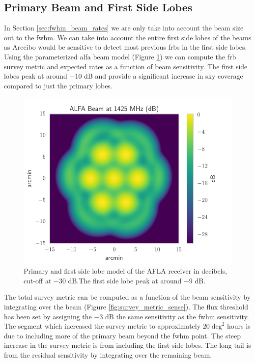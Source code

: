 \documentclass[a4paper,fleqn,usenatbib]{mnras}
\begin{document}
\subsection{Primary Beam and First Side Lobes}
\label{sec:full_beam_rates}

In Section \ref{sec:fwhm_beam_rates} we are only take into account the beam
size out to the \gls{fwhm}. We can take into account the entire first side lobes
of the beams as Arecibo would be sensitive to detect most previous
\glspl{frb} in the first side lobes. Using the parameterized \gls{alfa} beam
model (Figure \ref{fig:alfa_beam}) \citep{GALFAbeam} we can compute the
\gls{frb} survey metric and expected rates as a function of beam sensitivity.
The first side lobes peak at around $-10$ dB and provide a significant increase
in sky coverage compared to just the primary lobes.

\begin{figure}
    \includegraphics[width=1.0\linewidth]{figures/ALFA_beam_1425MHz_dB.pdf}
    \caption{Primary and first side lobe model of the AFLA receiver in
    decibels, cut-off at $-30$ dB.The first side lobe peak at around $-9$ dB.
    }
    \label{fig:alfa_beam}
\end{figure}

The total survey metric can be computed as a function of the beam sensitivity by
integrating over the beam (Figure \ref{fig:survey_metric_sense}). The flux
threshold has been set by assigning the $-3$ dB the same sensitivity as the
\gls{fwhm} sensitivity. The segment which increased the survey metric to
approximately $20 \; \textrm{deg}^2$ hours is due to including more of the
primary beam beyond the \gls{fwhm} point. The steep increase in the survey
metric is from including the first side lobes. The long tail is from the residual
sensitivity by integrating over the remaining beam.
\end{document}
